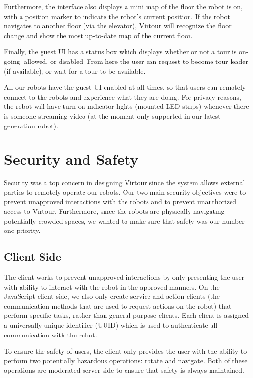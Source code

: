 \documentclass[
  oneside,
  11pt, a4paper,
  footinclude=true,
  headinclude=true,
  cleardoublepage=empty
]{article}
\begin{document}
Furthermore, the interface also displays a mini map of the floor the robot is
on, with a position marker to indicate the robot's current position.  If the
robot navigates to another floor (via the elevator), Virtour will recognize the
floor change and show the most up-to-date map of the current floor.

Finally, the guest UI has a status box which displays whether or not a tour is
on-going, allowed, or disabled. From here the user can request to become tour
leader (if available), or wait for a tour to be available.

All our robots have the guest UI enabled at all times, so that users can
remotely connect to the robots and experience what they are doing. For privacy
reasons, the robot will have turn on indicator lights (mounted LED strips)
whenever there is someone streaming video (at the moment only supported in our
latest generation robot).

\section{Security and Safety}

Security was a top concern in designing Virtour since the system allows
external parties to remotely operate our robots. Our two main security
objectives were to prevent unapproved interactions with the robots and to
prevent unauthorized access to Virtour. Furthermore, since the robots are
physically navigating potentially crowded spaces, we wanted to make sure that
safety was our number one priority.

\subsection{Client Side}

The client works to prevent unapproved interactions by only presenting the user
with ability to interact with the robot in the approved manners. On the
JavaScript client-side, we also only create service and action clients (the
communication methods that are used to request actions on the robot) that
perform specific tasks, rather than general-purpose clients. Each client is
assigned a universally unique identifier (UUID) which is used to authenticate
all communication with the robot.

To ensure the safety of users, the client only provides the user with the
ability to perform two potentially hazardous operations: rotate and navigate.
Both of these operations are moderated server side to ensure that safety is
always maintained.
\end{document}
